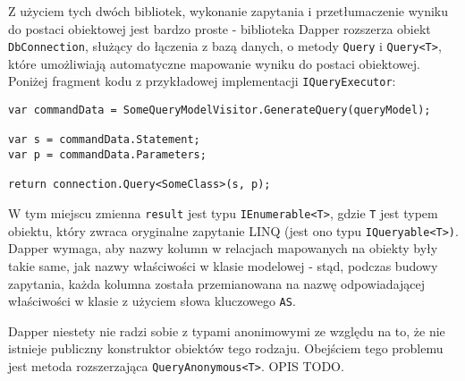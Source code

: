 Z użyciem tych dwóch bibliotek, wykonanie zapytania i przetłumaczenie wyniku do postaci obiektowej jest bardzo proste - biblioteka Dapper rozszerza obiekt \texttt{DbConnection}, służący do łączenia z bazą danych, o metody \texttt{Query} i \texttt{Query<T>}, które umożliwiają automatyczne mapowanie wyniku do postaci obiektowej. Poniżej fragment kodu z przykładowej implementacji \texttt{IQueryExecutor}:

\begin{lstlisting}
var commandData = SomeQueryModelVisitor.GenerateQuery(queryModel);

var s = commandData.Statement;
var p = commandData.Parameters;

return connection.Query<SomeClass>(s, p);
\end{lstlisting}

W tym miejscu zmienna \texttt{result} jest typu \texttt{IEnumerable<T>}, gdzie \texttt{T} jest typem obiektu, który zwraca oryginalne zapytanie LINQ (jest ono typu \texttt{IQueryable<T>)}. Dapper wymaga, aby nazwy kolumn w relacjach mapowanych na obiekty były takie same, jak nazwy właściwości w klasie modelowej - stąd, podczas budowy zapytania, każda kolumna została przemianowana na nazwę odpowiadającej właściwości w klasie z użyciem słowa kluczowego \texttt{AS}.

Dapper niestety nie radzi sobie z typami anonimowymi ze względu na to, że nie istnieje publiczny konstruktor obiektów tego rodzaju. Obejściem tego problemu jest metoda rozszerzająca \texttt{QueryAnonymous<T>}. OPIS TODO.